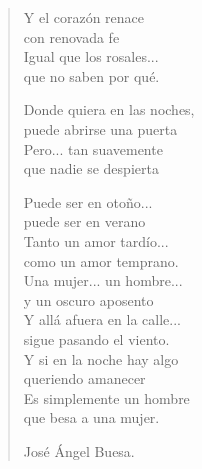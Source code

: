 \documentclass[11pt, portrait, twoside, notitlepage, openright]{book}
\begin{document}
\begin{verse}
Y el corazón renace\\
con renovada fe\\
Igual que los rosales...\\
que no saben por qué.
\newpage

Donde quiera en las noches,\\
puede abrirse una puerta\\
Pero... tan suavemente\\
que nadie se despierta
\newline

Puede ser en otoño...\\
puede ser en verano\\
Tanto un amor tardío...\\
como un amor temprano.\\
Una mujer... un hombre...\\
y un oscuro aposento\\
Y allá afuera en la calle...\\
sigue pasando el viento.\\
Y si en la noche hay algo\\
queriendo amanecer\\
Es simplemente un hombre\\
que besa a una mujer.
\newline

José Ángel Buesa.
\end{verse}
\end{document}
